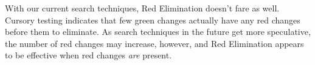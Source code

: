\documentclass{article}
\begin{document}
With our current search techniques,
Red Elimination doesn't fare as well.
Cursory testing indicates that few green changes
actually have any red changes before them to eliminate.
As search techniques in the future get more speculative,
the number of red changes may increase, however,
and Red Elimination appears to be effective
when red changes \emph{are} present.
\end{document}
